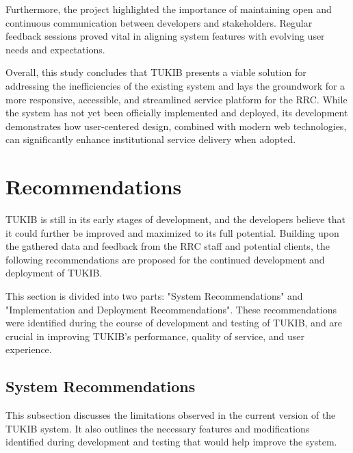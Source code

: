 Furthermore, the project highlighted the importance of maintaining open and continuous communication between developers and stakeholders. Regular feedback sessions proved vital in aligning system features with evolving user needs and expectations.

Overall, this study concludes that TUKIB presents a viable solution for addressing the inefficiencies of the existing system and lays the groundwork for a more responsive, accessible, and streamlined service platform for the RRC. While the system has not yet been officially implemented and deployed, its development demonstrates how user-centered design, combined with modern web technologies, can significantly enhance institutional service delivery when adopted.

\section{Recommendations}

TUKIB is still in its early stages of development, and the developers believe that it could further be improved and maximized to its full potential. Building upon the gathered data and feedback from the RRC staff and potential clients, the following recommendations are proposed for the continued development and deployment of TUKIB. 

This section is divided into two parts: "System Recommendations" and "Implementation and Deployment Recommendations". These recommendations were identified during the course of development and testing of TUKIB, and are crucial in improving TUKIB's performance, quality of service, and user experience.

\subsection{System Recommendations}

This subsection discusses the limitations observed in the current version of the TUKIB system. It also outlines the necessary features and modifications identified during development and testing that would help improve the system.

